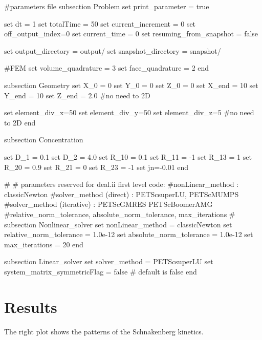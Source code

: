\begin{DoxyCode}
\textcolor{preprocessor}{#parameters file}
\textcolor{preprocessor}{}
subsection Problem
set print\_parameter = \textcolor{keyword}{true}

set dt = 1
set totalTime = 50
set current\_increment = 0
set off\_output\_index=0
set current\_time = 0
set resuming\_from\_snapshot = \textcolor{keyword}{false}

set output\_directory = output/
set snapshot\_directory = snapshot/

\textcolor{preprocessor}{#FEM}
\textcolor{preprocessor}{}set volume\_quadrature = 3 
set face\_quadrature = 2 
end

subsection Geometry
set X\_0 = 0
set Y\_0 = 0
set Z\_0 = 0
set X\_end = 10
set Y\_end = 10
set Z\_end = 2.0 #no need to 2D

set element\_div\_x=50
set element\_div\_y=50
set element\_div\_z=5 #no need to 2D
end

subsection Concentration

set D\_1 = 0.1
set D\_2 = 4.0
set R\_10 = 0.1
set R\_11 = -1
set R\_13 = 1
set R\_20 = 0.9
set R\_21 = 0
set R\_23 = -1
set jn=-0.01
end
                        
\textcolor{preprocessor}{#}
\textcolor{preprocessor}{}\textcolor{preprocessor}{# parameters reserved for deal.ii first level code:}
\textcolor{preprocessor}{}\textcolor{preprocessor}{#nonLinear\_method : classicNewton}
\textcolor{preprocessor}{}\textcolor{preprocessor}{#solver\_method (direct) : PETScsuperLU, PETScMUMPS}
\textcolor{preprocessor}{}\textcolor{preprocessor}{#solver\_method (iterative) : PETScGMRES PETScBoomerAMG}
\textcolor{preprocessor}{}\textcolor{preprocessor}{#relative\_norm\_tolerance, absolute\_norm\_tolerance, max\_iterations}
\textcolor{preprocessor}{}\textcolor{preprocessor}{#}
\textcolor{preprocessor}{}subsection Nonlinear\_solver
        set nonLinear\_method = classicNewton
        set relative\_norm\_tolerance = 1.0e-12
        set absolute\_norm\_tolerance = 1.0e-12
        set max\_iterations = 20
end
                        
subsection Linear\_solver
        set solver\_method = PETScsuperLU
        set system\_matrix\_symmetricFlag = \textcolor{keyword}{false} # \textcolor{keywordflow}{default} is \textcolor{keyword}{false}
end
\end{DoxyCode}
\hypertarget{growth_results}{}\section{Results}\label{growth_results}
The right plot shows the patterns of the Schnakenberg kinetics.   